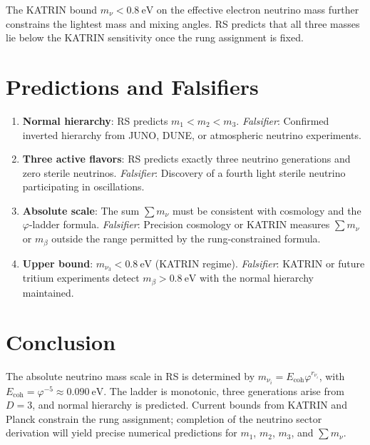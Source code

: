 \documentclass[12pt,a4paper]{article}
\theoremstyle{definition}
\theoremstyle{remark}
\begin{document}
The KATRIN bound $m_\nu < 0.8~\mathrm{eV}$ on the effective electron
neutrino mass further constrains the lightest mass and mixing angles.
RS predicts that all three masses lie below the KATRIN sensitivity once
the rung assignment is fixed.

\section{Predictions and Falsifiers}
\label{sec:falsifiers}

\begin{enumerate}[label=(\roman*)]
\item \textbf{Normal hierarchy}: RS predicts $m_1 < m_2 < m_3$.
  \textit{Falsifier}: Confirmed inverted hierarchy from JUNO, DUNE, or
  atmospheric neutrino experiments.

\item \textbf{Three active flavors}: RS predicts exactly three
  neutrino generations and zero sterile neutrinos.
  \textit{Falsifier}: Discovery of a fourth light sterile neutrino
  participating in oscillations.

\item \textbf{Absolute scale}: The sum $\sum m_\nu$ must be consistent
  with cosmology and the $\varphi$-ladder formula.
  \textit{Falsifier}: Precision cosmology or KATRIN measures
  $\sum m_\nu$ or $m_\beta$ outside the range permitted by the
  rung-constrained formula.

\item \textbf{Upper bound}: $m_{\nu_3} < 0.8~\mathrm{eV}$ (KATRIN
  regime).  \textit{Falsifier}: KATRIN or future tritium experiments
  detect $m_\beta > 0.8~\mathrm{eV}$ with the normal hierarchy
  maintained.
\end{enumerate}

\section{Conclusion}
\label{sec:conclusion}

The absolute neutrino mass scale in RS is determined by
$m_{\nu_i} = E_{\mathrm{coh}} \varphi^{r_{\nu_i}}$, with
$E_{\mathrm{coh}} = \varphi^{-5} \approx 0.090~\mathrm{eV}$.  The
ladder is monotonic, three generations arise from $D = 3$, and normal
hierarchy is predicted.  Current bounds from KATRIN and Planck
constrain the rung assignment; completion of the neutrino sector
derivation will yield precise numerical predictions for $m_1$, $m_2$,
$m_3$, and $\sum m_\nu$.
\end{document}
